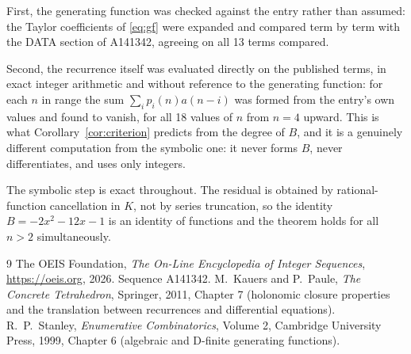 \documentclass[11pt,a4paper]{article}
\theoremstyle{plain}
\theoremstyle{definition}
\begin{document}
First, the generating function was checked against the entry rather than assumed: the
Taylor coefficients of \eqref{eq:gf} were expanded and compared term by term with the DATA
section of A141342, agreeing on all 13 terms compared.

Second, the recurrence itself was evaluated directly on the published terms, in exact
integer arithmetic and without reference to the generating function: for each $n$ in range
the sum $\sum_{i}p_{i}(n)a(n-i)$ was formed from the entry's own values and found to
vanish, for all 18 values of $n$ from $n=4$ upward. This is what
Corollary~\ref{cor:criterion} predicts from the degree of $B$, and it is a genuinely
different computation from the symbolic one: it never forms $B$, never differentiates, and
uses only integers.

The symbolic step is exact throughout. The residual is obtained by rational-function
cancellation in $K$, not by series truncation, so the identity $B=- 2 x^{2} - 12 x - 1$ is an
identity of functions and the theorem holds for all $n>2$ simultaneously.

\begin{thebibliography}{9}
 The OEIS Foundation, \emph{The On-Line Encyclopedia of Integer Sequences},
\url{https://oeis.org}, 2026. Sequence A141342.
 M.~Kauers and P.~Paule, \emph{The Concrete Tetrahedron}, Springer, 2011,
Chapter 7 (holonomic closure properties and the translation between recurrences and
differential equations).
 R.~P.~Stanley, \emph{Enumerative Combinatorics}, Volume 2, Cambridge
University Press, 1999, Chapter 6 (algebraic and D-finite generating functions).
\end{thebibliography}
\end{document}
